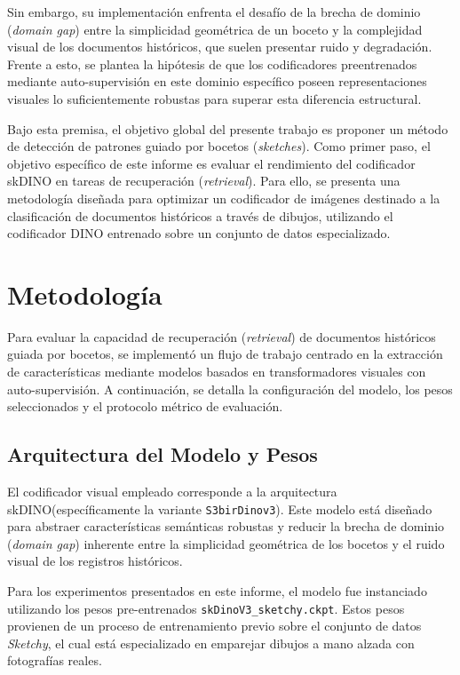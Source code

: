 \documentclass[11pt]{article}
\begin{document}
Sin embargo, su implementación enfrenta el desafío de la brecha de dominio (\textit{domain gap}) entre la simplicidad geométrica de un boceto y la complejidad visual de los documentos históricos, que suelen presentar ruido y degradación. Frente a esto, se plantea la hipótesis de que los codificadores preentrenados mediante auto-supervisión en este dominio específico poseen representaciones visuales lo suficientemente robustas para superar esta diferencia estructural.

Bajo esta premisa, el objetivo global del presente trabajo es proponer un método de detección de patrones guiado por bocetos (\textit{sketches}). Como primer paso, el objetivo específico de este informe es evaluar el rendimiento del codificador skDINO en tareas de recuperación (\textit{retrieval}). Para ello, se presenta una metodología diseñada para optimizar un codificador de imágenes destinado a la clasificación de documentos históricos a través de dibujos, utilizando el codificador DINO entrenado sobre un conjunto de datos especializado.

\section{Metodología}

Para evaluar la capacidad de recuperación (\textit{retrieval}) de documentos históricos guiada por bocetos, se implementó un flujo de trabajo centrado en la extracción de características mediante modelos basados en transformadores visuales con auto-supervisión. A continuación, se detalla la configuración del modelo, los pesos seleccionados y el protocolo métrico de evaluación.

\subsection{Arquitectura del Modelo y Pesos}
El codificador visual empleado corresponde a la arquitectura skDINO(específicamente la variante \texttt{S3birDinov3}). Este modelo está diseñado para abstraer características semánticas robustas y reducir la brecha de dominio (\textit{domain gap}) inherente entre la simplicidad geométrica de los bocetos y el ruido visual de los registros históricos. 

Para los experimentos presentados en este informe, el modelo fue instanciado utilizando los pesos pre-entrenados \texttt{skDinoV3\_sketchy.ckpt}. Estos pesos provienen de un proceso de entrenamiento previo sobre el conjunto de datos \textit{Sketchy}, el cual está especializado en emparejar dibujos a mano alzada con fotografías reales.
\end{document}
